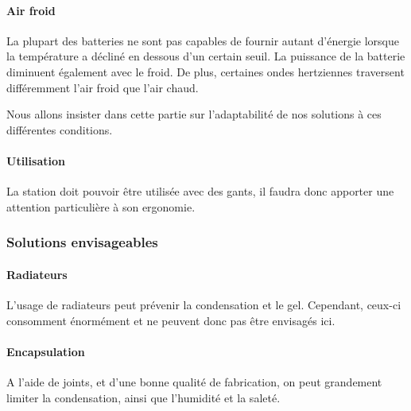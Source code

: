 \paragraph{Air froid}

La plupart des batteries ne sont pas capables de fournir autant d'énergie lorsque la température a décliné en dessous d'un certain seuil. La puissance de la batterie diminuent également avec le froid.
De plus, certaines ondes hertziennes traversent différemment l’air froid que l’air chaud\footnotemark.


Nous allons insister dans cette partie sur l'adaptabilité de nos solutions à ces différentes conditions.


\paragraph{Utilisation}

La station doit pouvoir être utilisée avec des gants, il faudra donc apporter une attention particulière à son ergonomie.

\subsubsection{Solutions envisageables}

\paragraph{Radiateurs}

L'usage de radiateurs peut prévenir la condensation et le gel. Cependant, ceux-ci consomment énormément et ne peuvent donc pas être envisagés ici.

\paragraph{Encapsulation}

A l'aide de joints, et d'une bonne qualité de fabrication, on peut grandement limiter la condensation, ainsi que l'humidité et la saleté.

